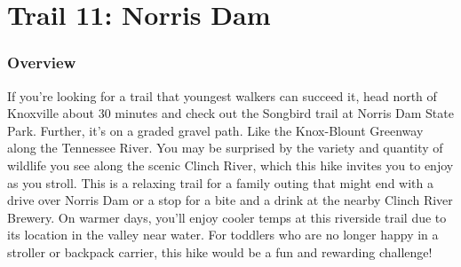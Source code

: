 \documentclass[
  letterpaper,
  DIV=11,
  numbers=noendperiod]{scrreprt}
\begin{document}
\chapter{Trail 11: Norris Dam}\label{trail-11-norris-dam}

\subsection{Overview}\label{overview-11}

If you're looking for a trail that youngest walkers can succeed it, head
north of Knoxville about 30 minutes and check out the Songbird trail at
Norris Dam State Park. Further, it's on a graded gravel path. Like the
Knox-Blount Greenway along the Tennessee River. You may be surprised by
the variety and quantity of wildlife you see along the scenic Clinch
River, which this hike invites you to enjoy as you stroll. This is a
relaxing trail for a family outing that might end with a drive over
Norris Dam or a stop for a bite and a drink at the nearby Clinch River
Brewery. On warmer days, you'll enjoy cooler temps at this riverside
trail due to its location in the valley near water. For toddlers who are
no longer happy in a stroller or backpack carrier, this hike would be a
fun and rewarding challenge!
\end{document}
